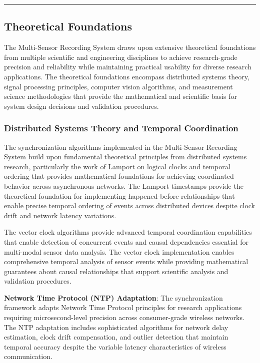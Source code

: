 \documentclass[12pt,a4paper]{article}
\begin{document}
\hrule

\subsection{Theoretical Foundations}

The Multi-Sensor Recording System draws upon extensive theoretical foundations from multiple scientific and engineering
disciplines to achieve research-grade precision and reliability while maintaining practical usability for diverse
research applications. The theoretical foundations encompass distributed systems theory, signal processing principles,
computer vision algorithms, and measurement science methodologies that provide the mathematical and scientific basis for
system design decisions and validation procedures.

\subsubsection{Distributed Systems Theory and Temporal Coordination}

The synchronization algorithms implemented in the Multi-Sensor Recording System build upon fundamental theoretical
principles from distributed systems research, particularly the work of Lamport on logical clocks and temporal ordering
that provides mathematical foundations for achieving coordinated behavior across asynchronous networks. The Lamport
timestamps provide the theoretical foundation for implementing happened-before relationships that enable precise
temporal ordering of events across distributed devices despite clock drift and network latency variations.

The vector clock algorithms provide advanced temporal coordination capabilities that enable detection of concurrent
events and causal dependencies essential for multi-modal sensor data analysis. The vector clock implementation enables
comprehensive temporal analysis of sensor events while providing mathematical guarantees about causal relationships that
support scientific analysis and validation procedures.

\textbf{Network Time Protocol (NTP) Adaptation}: The synchronization framework adapts Network Time Protocol principles for
research applications requiring microsecond-level precision across consumer-grade wireless networks. The NTP adaptation
includes sophisticated algorithms for network delay estimation, clock drift compensation, and outlier detection that
maintain temporal accuracy despite the variable latency characteristics of wireless communication.
\end{document}

